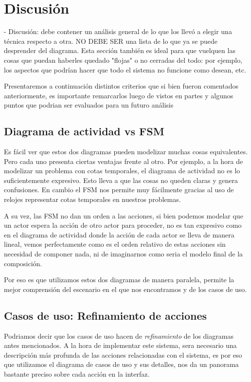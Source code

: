 \section{Discusi\'on}
- Discusión: debe contener un análisis general de lo que los llevó a elegir una técnica respecto a otra. NO DEBE SER una lista de lo que ya se puede desprender del diagrama. Esta sección también es ideal para que vuelquen las cosas que puedan haberles quedado "flojas" o no cerradas del todo: por ejemplo, los aspectos que podrían hacer que todo el sistema no funcione como desean, etc.

Presentaremos a continuación distintos criterios que si bien fueron comentados anteriormente, es importante remarcarlos luego de vistos en partes y algunos puntos que podrian ser evaluados para un futuro análisis

\subsection{Diagrama de actividad vs FSM}

Es fácil ver que estos dos diagramas pueden modelizar muchas cosas equivalentes. Pero cada uno presenta ciertas ventajas frente al otro.
Por ejemplo, a la hora de modelizar un problema con cotas temporales, el diagrama de actividad no es lo suficientemente expresivo. Esto lleva a que las cosas no queden claras y genera confusiones. En cambio el FSM nos permite muy fácilmente gracias al uso de relojes representar cotas temporales en nuestros problemas.

A su vez, las FSM no dan un orden a las acciones, si bien podemos modelar que un actor espera la acción de otro actor para proceder, no es tan expresivo como en el diagrama de actividad donde la acción de cada actor se lleva de manera lineal, vemos perfectamente como es el orden relativo de estas acciones sin necesidad de componer nada, ni de imaginarnos como seria el modelo final de la composición.

Por eso es que utilizamos estos dos diagramas de manera paralela, permite la mejor comprensión del escenario en el que nos encontramos y de los casos de uso.

\subsection{Casos de uso: Refinamiento de acciones}

Podriamos decir que los casos de uso hacen de \textit{refinamiento} de los diagramas antes mencionados. A la hora de implementar este sistema, sera necesario una descripción más profunda de las acciones relacionadas con el sistema, es por eso que utilizamos el diagrama de casos de uso y sus detalles, nos da un panorama bastante preciso sobre cada acción en la interfaz. 

